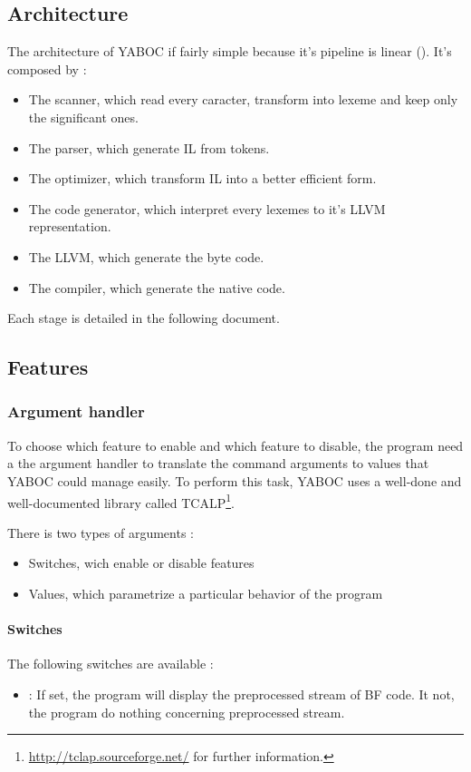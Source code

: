 \subsection{Architecture}
The architecture of \gls{YABOC} if fairly simple because it's pipeline is linear (\cf {}).
It's composed by :
\begin{itemize}
        \item The scanner, which read every caracter, transform into \gls{lexeme} and keep only the significant ones.
        \item The parser, which generate \gls{IL} from tokens.
        \item The optimizer, which transform \gls{IL} into a better efficient form.
        \item The code generator, which interpret every lexemes to it's LLVM representation.
        \item The LLVM, which generate the byte code.
        \item The compiler, which generate the native code.
\end{itemize}

\newpar Each stage is detailed in the following document.

\subsection{Features}
\subsubsection{Argument handler}
To choose which feature to enable and which feature to disable, the program need a the argument handler to translate the command arguments to values that YABOC could manage easily. To perform this task, YABOC uses a well-done and well-documented library called TCALP\footnote{\cf \url{http://tclap.sourceforge.net/} for further information.}.

There is two types of arguments :
\begin{itemize}
        \item Switches, wich enable or disable features
        \item Values, which parametrize a particular behavior of the program
\end{itemize}

\paragraph{Switches} 
The following switches are available :
\begin{itemize}
        \item {} : If set, the program will display the preprocessed stream of BF code. It not, the program do nothing concerning preprocessed stream.
\end{itemize}

